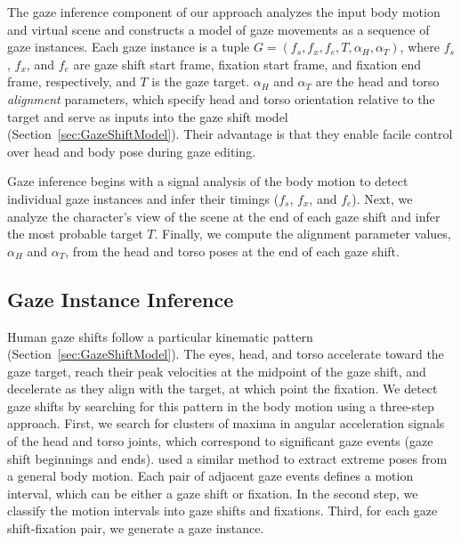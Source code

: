The gaze inference component of our approach analyzes the input body motion and virtual scene and constructs a model of gaze movements as a sequence of gaze instances. Each gaze instance is a tuple $G = (f_s, f_x, f_e, T, \alpha_{H}, \alpha_{T})$, where $f_s$, $f_x$, and $f_e$ are gaze shift start frame, fixation start frame, and fixation end frame, respectively, and $T$ is the gaze target. $\alpha_{H}$ and $\alpha_{T}$ are the head and  torso \emph{alignment} parameters, which specify head and torso orientation relative to the target and serve as inputs into the gaze shift model (Section~\ref{sec:GazeShiftModel}). Their advantage is that they enable facile control over head and body pose during gaze editing.

Gaze inference begins with a signal analysis of the body motion to detect individual gaze instances and infer their timings ($f_s$, $f_x$, and $f_e$). Next, we analyze the character's view of the scene at the end of each gaze shift and infer the most probable target $T$. Finally, we compute the alignment parameter values, $\alpha_{H}$ and $\alpha_{T}$, from the head and torso poses at the end of each gaze shift.

\subsection{Gaze Instance Inference}
\label{sec:GazeTimingInference}

Human gaze shifts follow a particular kinematic pattern (Section~\ref{sec:GazeShiftModel}). The eyes, head, and torso accelerate toward the gaze target, reach their peak velocities at the midpoint of the gaze shift, and decelerate as they align with the target, at which point the fixation. We detect gaze shifts by searching for this pattern in the body motion using a three-step approach. First, we search for clusters of maxima in angular acceleration signals of the head and torso joints, which correspond to significant gaze events (gaze shift beginnings and ends). \citet{coleman2008staggered} used a similar method to extract extreme poses from a general body motion. Each pair of adjacent gaze events defines a motion interval, which can be either a gaze shift or fixation. In the second step, we classify the motion intervals into gaze shifts and fixations. Third, for each gaze shift-fixation pair, we generate a gaze instance.

